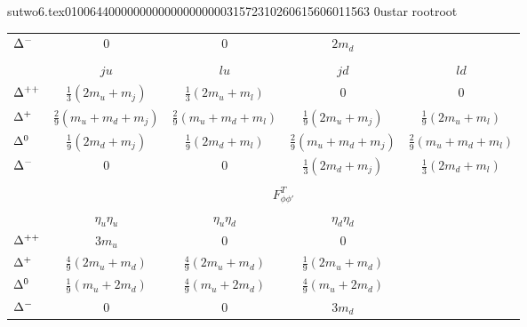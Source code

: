                                                                                                                                                                                                                                                                                       sutwo6.tex                                                                                          0100644 0000000 0000000 00000315723 10260615606 011563  0                                                                                                    ustar   root                            root                                                                                                                                                                                                                   \documentclass[prd,amssymb,amsmath,showpacs,nofootinbib,superscriptaddress]{revtex4}
\begin{document}
\begin{table}[ht]
\begin{tabular}{l | c c c c }
${\Delta}^-$ 
           &  $0$ & $0$  & $2 m_d$ & \\
\multicolumn{5}{c}{} 
\\
        & $\quad ju \quad$ & $\quad lu \quad$ & $\quad jd \quad$ & $\quad ld \quad$ \\
\hline
${\Delta}^{++}$    &  $\frac{1}{3} (2 m_u + m_j)$ & $\frac{1}{3}(2 m_u + m_l)$  & $0$ & $0$ \\
${\Delta}^+$       &  $\frac{2}{9}(m_u + m_d + m_j)$ & $\frac{2}{9}(m_u + m_d + m_l)$  & $\frac{1}{9} (2 m_u + m_j)$ & $\frac{1}{9} (2 m_u + m_l)$ \\
${\Delta}^0$       &  $\frac{1}{9}(2 m_d + m_j)$ & $\frac{1}{9}(2 m_d + m_l)$  & $\frac{2}{9}(m_u + m_d + m_j)$ & $\frac{2}{9}(m_u + m_d + m_l)$ \\
${\Delta}^-$       &  $0$ & $0$  & $\frac{1}{3}(2 m_d + m_j)$ & $\frac{1}{3} (2 m_d + m_l)$ \\
\multicolumn{5}{c}{} 
\\
& \multicolumn{4}{c}{$F^T_{\phi\phi'}$ \phantom{sp}} 
\\
        & $\quad \eta_u \eta_u \quad$ & $\quad \eta_u \eta_d \quad $& $\quad \eta_d \eta_d \quad$ &\\
\hline
${\Delta}^{++}$    &  $3 m_u$ & $0$  & $0$ &\\
${\Delta}^+$       &  $\frac{4}{9}(2 m_u + m_d)$   & $\frac{4}{9}(2 m_u + m_d)$  & $\frac{1}{9}(2 m_u + m_d)$ & \\
${\Delta}^0$       &  $\frac{1}{9} ( m_u + 2 m_d )$  & $\frac{4}{9}(m_u + 2 m_d)$  & $\frac{4}{9}(m_u + 2 m_d)$ & \\
${\Delta}^-$       &  $0$ & $0$  & $3 m_d$ & 
\end{tabular}
\label{t:PQQCD-F}
\end{table}

\begingroup
\squeezetable
\end{document}
